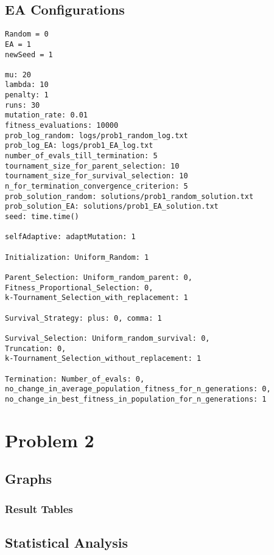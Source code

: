 \documentclass[•]{article}
\begin{document}
\subsection{EA Configurations}
\begin{lstlisting}
Random = 0
EA = 1
newSeed = 1

mu: 20
lambda: 10
penalty: 1
runs: 30
mutation_rate: 0.01
fitness_evaluations: 10000
prob_log_random: logs/prob1_random_log.txt
prob_log_EA: logs/prob1_EA_log.txt
number_of_evals_till_termination: 5
tournament_size_for_parent_selection: 10
tournament_size_for_survival_selection: 10
n_for_termination_convergence_criterion: 5
prob_solution_random: solutions/prob1_random_solution.txt
prob_solution_EA: solutions/prob1_EA_solution.txt
seed: time.time()

selfAdaptive: adaptMutation: 1

Initialization: Uniform_Random: 1

Parent_Selection: Uniform_random_parent: 0, Fitness_Proportional_Selection: 0, 
k-Tournament_Selection_with_replacement: 1

Survival_Strategy: plus: 0, comma: 1

Survival_Selection: Uniform_random_survival: 0, 
Truncation: 0, 
k-Tournament_Selection_without_replacement: 1

Termination: Number_of_evals: 0, no_change_in_average_population_fitness_for_n_generations: 0, no_change_in_best_fitness_in_population_for_n_generations: 1
\end{lstlisting}

\section{Problem 2}
\subsection{Graphs}
\subsubsection{Result Tables}
\subsection{Statistical Analysis}
\end{document}
